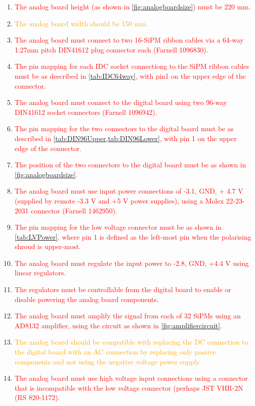 \documentclass[a4paper]{article}
\newcommand{\must}[1]{\textcolor{red}{#1}}
\newcommand{\should}[1]{\textcolor{orange}{#1}}
\begin{document}
\begin{enumerate}
    \item \must{The analog board height (as shown in \cref{fig:analogboardsize}) must be 220 mm.}
    \item \should{The analog board width should be 150 mm.}
    \item \must{The analog board must connect to two 16-SiPM ribbon cables via a 64-way 1.27mm pitch DIN41612 plug connector each (Farnell 1096830).}
    \item \must{The pin mapping for each IDC socket connectiong to the SiPM ribbon cables must be as described in \cref{tab:IDC64way}, with pin1 on the upper edge of the connector.}
    \item \must{The analog board must connect to the digital board using two 96-way DIN41612 socket connectors (Farnell 1096942).}
    \item \must{The pin mapping for the two connectors to the digital board must be as described in \cref{tab:DIN96Upper,tab:DIN96Lower}, with pin 1 on the upper edge of the connector.}
    \item \must{The position of the two connectors to the digital board must be as shown in \cref{fig:analogboardsize}.}
    \item \must{The analog board must use input power connections of -3.1, GND, + 4.7 V (supplied by remote -3.3 V and +5 V power supplies), using a Molex 22-23-2031 connector (Farnell 1462950).}
    \item \must{The pin mapping for the low voltage connector must be as shown in \cref{tab:LVPower}, where pin 1 is defined as the left-most pin when the polarising shroud is upper-most.}
    \item \must{The analog board must regulate the input power to -2.8, GND, +4.4 V using linear regulators.}
    \item \must{The regulators must be controllable from the digital board to enable or disable powering the analog board components.}
    \item \must{The analog board must amplify the signal from each of 32 SiPMs using an AD8132 amplifier, using the circuit as shown in \cref{fig:amplifiercircuit}.}
    \item \should{The analog board should be compatible with replacing the DC connection to the digital board with an AC connection by replacing only passive components and not using the negative voltage power supply.}
    \item \must{The analog board must use high voltage input connections using a connector that is incompatible with the low voltage connector (perhaps JST VHR-2N (RS 820-1172).}

\end{enumerate}
\end{document}
